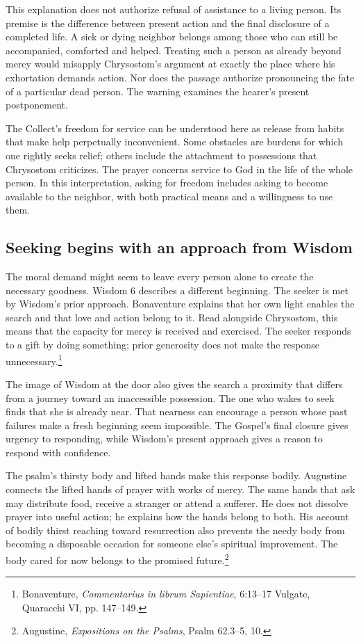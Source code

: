 This explanation does not authorize refusal of assistance to a living person. Its premise is the difference between present action and the final disclosure of a completed life. A sick or dying neighbor belongs among those who can still be accompanied, comforted and helped. Treating such a person as already beyond mercy would misapply Chrysostom's argument at exactly the place where his exhortation demands action. Nor does the passage authorize pronouncing the fate of a particular dead person. The warning examines the hearer's present postponement.

The Collect's freedom for service can be understood here as release from habits that make help perpetually inconvenient. Some obstacles are burdens for which one rightly seeks relief; others include the attachment to possessions that Chrysostom criticizes. The prayer concerns service to God in the life of the whole person. In this interpretation, asking for freedom includes asking to become available to the neighbor, with both practical means and a willingness to use them.

\subsection{Seeking begins with an approach from Wisdom}
The moral demand might seem to leave every person alone to create the necessary goodness. Wisdom 6 describes a different beginning. The seeker is met by Wisdom's prior approach. Bonaventure explains that her own light enables the search and that love and action belong to it. Read alongside Chrysostom, this means that the capacity for mercy is received and exercised. The seeker responds to a gift by doing something; prior generosity does not make the response unnecessary.\footnote{Bonaventure, \textit{Commentarius in librum Sapientiae}, 6:13--17 Vulgate, Quaracchi VI, pp. 147--149.}

The image of Wisdom at the door also gives the search a proximity that differs from a journey toward an inaccessible possession. The one who wakes to seek finds that she is already near. That nearness can encourage a person whose past failures make a fresh beginning seem impossible. The Gospel's final closure gives urgency to responding, while Wisdom's present approach gives a reason to respond with confidence.

The psalm's thirsty body and lifted hands make this response bodily. Augustine connects the lifted hands of prayer with works of mercy. The same hands that ask may distribute food, receive a stranger or attend a sufferer. He does not dissolve prayer into useful action; he explains how the hands belong to both. His account of bodily thirst reaching toward resurrection also prevents the needy body from becoming a disposable occasion for someone else's spiritual improvement. The body cared for now belongs to the promised future.\footnote{Augustine, \textit{Expositions on the Psalms}, Psalm 62.3--5, 10.}

